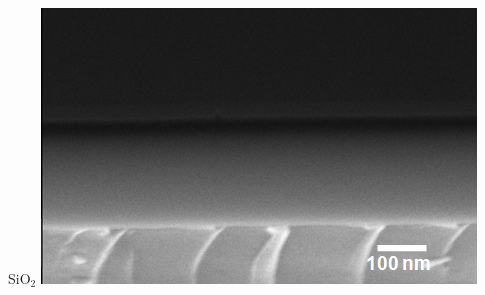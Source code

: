 \documentclass[noamsthm,8pt,t,xcolor={dvipsnames}]{beamer}
\begin{document}
\begin{frame}
\begin{columns}
\begin{column}{0.4\textwidth}
\begin{center}
            \vspace{0.3cm}
            SiO$_2$
            \includegraphics[width=\linewidth]{figures/SEM-Xsection-SiO2.png}
         \end{center}
      \end{column}
   \end{columns}
\end{frame}
\end{document}
